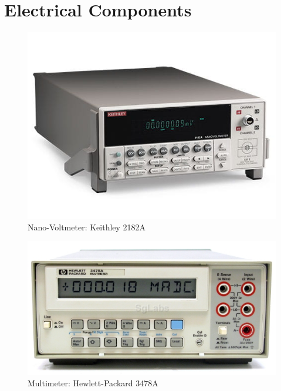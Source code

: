 \documentclass[12pt, titlepage]{article}
\begin{document}
\section{Electrical Components}
\label{Apx.C}

\begin{figure}[H]
\centerline{\includegraphics[scale=0.5]{1.jpg}}
\caption{Nano-Voltmeter: Keithley 2182A}
\label{fig}
\end{figure}

\begin{figure}[H]
\centerline{\includegraphics[scale=1]{2.jpg}}
\caption{Multimeter: Hewlett-Packard 3478A}
\label{fig}
\end{figure}
\end{document}
